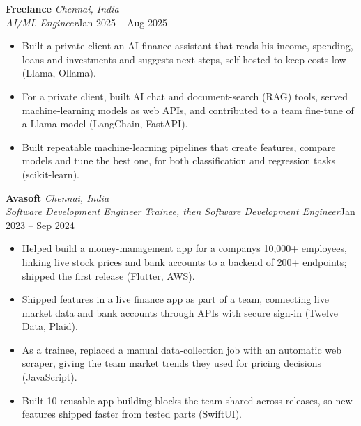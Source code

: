 \documentclass[a4paper,11pt]{article}
\newcommand{\role}[4]{%
  \textbf{#1}{\color{muted}\,\textperiodcentered\,\textit{#2}}\\
  \textit{#4}\hfill{\color{muted}#3}\par}
\newcommand{\gap}{\vspace{5pt}}
\begin{document}
\gap
{}
\role{Freelance}{Chennai, India}{Jan 2025 – Aug 2025}{AI/ML Engineer}
\begin{itemize}
  \item Built a private client an AI finance assistant that reads his income, spending, loans and investments and suggests next steps, self-hosted to keep costs low (Llama, Ollama).
  \item For a private client, built AI chat and document-search (RAG) tools, served machine-learning models as web APIs, and contributed to a team fine-tune of a Llama model (LangChain, FastAPI).
  \item Built repeatable machine-learning pipelines that create features, compare models and tune the best one, for both classification and regression tasks (scikit-learn).
\end{itemize}
\gap
{}
\role{Avasoft}{Chennai, India}{Jan 2023 – Sep 2024}{Software Development Engineer Trainee, then Software Development Engineer}
\begin{itemize}
  \item Helped build a money-management app for a company\textquotesingle{}s 10,000+ employees, linking live stock prices and bank accounts to a backend of 200+ endpoints; shipped the first release (Flutter, AWS).
  \item Shipped features in a live finance app as part of a team, connecting live market data and bank accounts through APIs with secure sign-in (Twelve Data, Plaid).
  \item As a trainee, replaced a manual data-collection job with an automatic web scraper, giving the team market trends they used for pricing decisions (JavaScript).
  \item Built 10 reusable app building blocks the team shared across releases, so new features shipped faster from tested parts (SwiftUI).
\end{itemize}
\end{document}
